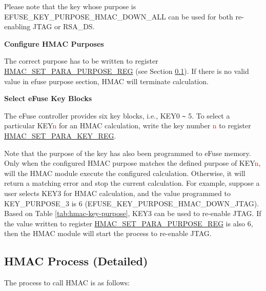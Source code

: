 \documentclass[main\_\_EN.tex]{subfiles}
\begin{document}
Please note that the key whose purpose is EFUSE\_KEY\_PURPOSE\_HMAC\_DOWN\_ALL can be used for both re-enabling JTAG or RSA\_DS.




\textbf{Configure HMAC Purposes}
\label{sec:hmac-config-purposes}

The correct purpose has to be written to register \hyperref[regdesc:HMACSETPARAPURPOSEREG]{HMAC\_SET\_PARA\_PURPOSE\_REG} (see Section \ref{sec:hmac-process-detailed}). If there is no valid value in efuse purpose section, HMAC will terminate calculation.

\textbf{Select eFuse Key Blocks}
\label{sec:hmac-config-efuse-key}

The eFuse controller provides six key blocks, i.e., KEY0 \verb+~+ 5. To select a particular KEY\textcolor{red}{n} for an HMAC calculation, write the key number \textcolor{red}{n} to register \hyperref[regdesc:HMACSETPARAKEYREG]{HMAC\_SET\_PARA\_KEY\_REG}.

Note that the purpose of the key has also been programmed to eFuse memory. Only when the configured HMAC purpose matches the defined purpose of KEY\textcolor{red}{n}, will the HMAC module execute the configured calculation. Otherwise, it will return a matching error and stop the current calculation.
For example, suppose a user selects KEY3 for HMAC calculation, and the value programmed to KEY\_PURPOSE\_3 is 6 (EFUSE\_KEY\_PURPOSE\_HMAC\_DOWN\_JTAG). Based on Table \ref{tab:hmac-key-purpose}, KEY3 can be used to re-enable JTAG. If the value written to register \hyperref[regdesc:HMACSETPARAPURPOSEREG]{HMAC\_SET\_PARA\_PURPOSE\_REG} is also 6, then the HMAC module will start the process to re-enable JTAG.


\subsection{HMAC Process (Detailed)}
\label{sec:hmac-process-detailed}
The process to call HMAC is as follows:
\end{document}
